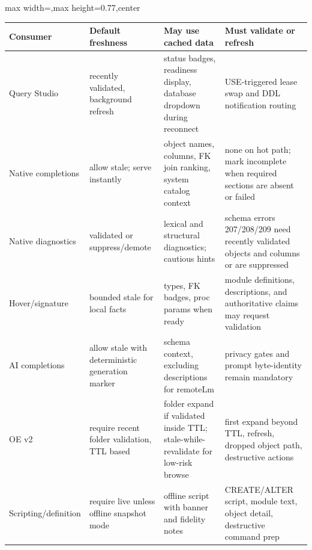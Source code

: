 \documentclass[10pt]{article}
\begin{document}
\begin{adjustbox}{max width=\linewidth,max height=0.77\textheight,center}
\begin{minipage}{0.98\linewidth}
\scriptsize
\begin{tabularx}{\linewidth}{>{\raggedright\arraybackslash}p{29mm} >{\raggedright\arraybackslash}p{38mm} >{\raggedright\arraybackslash}p{42mm} >{\raggedright\arraybackslash}X}
\toprule
\textbf{Consumer} & \textbf{Default freshness} & \textbf{May use cached data} & \textbf{Must validate or refresh} \\
\midrule
Query Studio & recently validated, background refresh & status badges, readiness display, database dropdown during reconnect & USE-triggered lease swap and DDL notification routing \\
Native completions & allow stale; serve instantly & object names, columns, FK join ranking, system catalog context & none on hot path; mark incomplete when required sections are absent or failed \\
Native diagnostics & validated or suppress/demote & lexical and structural diagnostics; cautious hints & schema errors 207/208/209 need recently validated objects and columns or are suppressed \\
Hover/signature & bounded stale for local facts & types, FK badges, proc params when ready & module definitions, descriptions, and authoritative claims may request validation \\
AI completions & allow stale with deterministic generation marker & schema context, excluding descriptions for remoteLm & privacy gates and prompt byte-identity remain mandatory \\
OE v2 & require recent folder validation, TTL based & folder expand if validated inside TTL; stale-while-revalidate for low-risk browse & first expand beyond TTL, refresh, dropped object path, destructive actions \\
Scripting/definition & require live unless offline snapshot mode & offline script with banner and fidelity notes & CREATE/ALTER script, module text, object detail, destructive command prep \\
\bottomrule
\end{tabularx}


\end{minipage}
\end{adjustbox}
\end{document}
